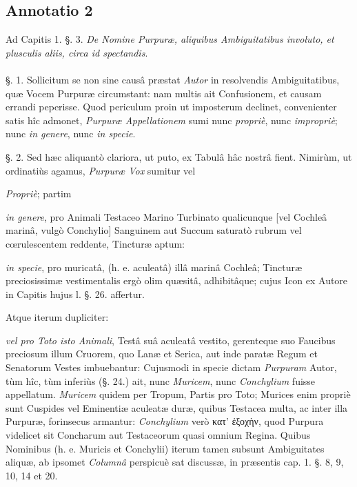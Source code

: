 \documentclass[a4paper, 11pt, oneside, polutonikogreek, german]{article}
\begin{document}
\subsection{Annotatio 2}
\begin{center}
Ad Capitis 1. §. 3. \emph{De Nomine Purpuræ, aliquibus Ambiguitatibus involuto, et plusculis aliis, circa id spectandis}.
\end{center}
\paragraph{}
§. 1. Sollicitum se non sine causâ præstat \emph{Autor} in resolvendis Ambiguitatibus, quæ Vocem Purpuræ circumstant: nam multis ait Confusionem, et causam errandi peperisse. Quod periculum proin ut imposterum declinet, convenienter satis hîc admonet, \emph{Purpuræ Appellationem} sumi nunc \emph{propriè}, nunc \emph{impropriè}; nunc \emph{in genere}, nunc \emph{in specie}.

§. 2. Sed hæc aliquantò clariora, ut puto, ex Tabulâ hâc nostrâ fient. Nimirùm, ut ordinatiùs agamus, \emph{Purpuræ Vox} sumitur vel

\emph{Propriè}; partim

\emph{in genere}, pro Animali Testaceo Marino Turbinato qualicunque [vel Cochleâ marinâ, vulgò Conchylio] Sanguinem aut Succum saturatò rubrum vel cœrulescentem reddente, Tincturæ aptum:

\emph{in specie}, pro muricatâ, (h. e. aculeatâ) illâ marinâ Cochleâ; Tincturæ preciosissimæ vestimentalis ergò olim quæsitâ, adhibitâque; cujus Icon ex Autore in Capitis hujus l. §. 26. affertur.

Atque iterum dupliciter:

\emph{vel pro Toto isto Animali}, Testâ suâ aculeatâ vestito, gerenteque suo Faucibus preciosum illum Cruorem, quo Lanæ et Serica, aut inde paratæ Regum et Senatorum Vestes imbuebantur: Cujusmodi in specie dictam \emph{Purpuram} Autor, tùm hîc, tùm inferiùs (§. 24.) ait, nunc \emph{Muricem}, nunc \emph{Conchylium} fuisse appellatum. \emph{Muricem} quidem per Tropum, Partis pro Toto; Murices enim propriè sunt Cuspides vel Eminentiæ aculeatæ duræ, quibus Testacea multa, ac inter illa Purpuræ, forinsecus armantur: \emph{Conchylium} verò κατ' ἐξοχὴν, quod Purpura videlicet sit Concharum aut Testaceorum quasi omnium Regina. Quibus Nominibus (h. e. Muricis et Conchylii) iterum tamen subsunt Ambiguitates aliquæ, ab ipsomet \emph{Columnâ} perspicuè sat discussæ, in præsentis cap. 1. §. 8, 9, 10, 14 et 20.
\end{document}
